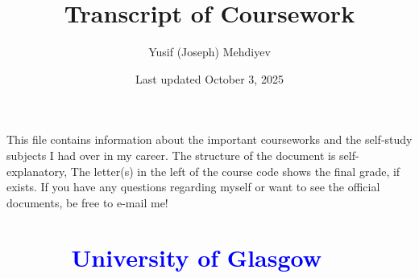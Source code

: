 \documentclass[12pt]{article}
\title{Transcript of Coursework}
\author{Yusif (Joseph) Mehdiyev}
\date{Last updated October 3, 2025}
\begin{document}
\maketitle

This file contains information  about the important courseworks and the self-study subjects  I had over in my career. The structure of the document is self-explanatory, The letter(s) in the left of the course code shows the final grade, if exists. If you have any questions regarding myself or want to see the official documents, be free to e-mail me!
\renewcommand{\contentsname}{Contents:} %
\tableofcontents
{}
\section*{\textcolor{blue}{\ \ \ \ \  University of Glasgow}}
\end{document}
